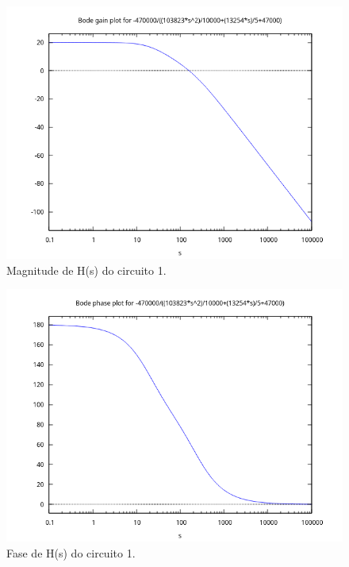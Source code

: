 \documentclass[12pt,twoside, a4paper, twocolumn]{article}
\begin{document}
\begin{figure}[h]
    \centering
    \includegraphics[width=1\columnwidth]{images/H1bodegain.png}
    \caption{Magnitude de H(s) do circuito 1.}
\end{figure}




\begin{figure}[h]
    \centering
    \includegraphics[width=1\columnwidth]{images/H1bodephase.png}
    \caption{Fase de H(s) do circuito 1.}
\end{figure}




\subparagraph*{}
\end{document}

